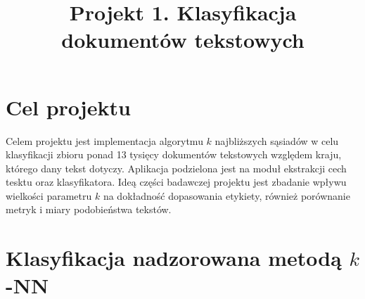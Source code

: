 \documentclass{classrep}
\author{
  \studentinfo{Daria Rogowska}{229989} \and
  \studentinfo{Mateusz Srebnik}{230004} }
\title{Projekt 1. Klasyfikacja dokumentów tekstowych}
\begin{document}
\maketitle


\section{Cel projektu}
Celem projektu jest implementacja algorytmu $k$ najbliższych sąsiadów w celu klasyfikacji
zbioru ponad 13 tysięcy dokumentów tekstowych \cite{teksty} względem kraju, którego dany tekst dotyczy. Aplikacja podzielona jest na moduł ekstrakcji 
cech tesktu oraz klasyfikatora. 
Ideą części badawczej projektu jest zbadanie wpływu wielkości parametru $k$
na dokładność dopasowania etykiety, również porównanie metryk i miary podobieństwa tekstów.





\section{Klasyfikacja nadzorowana metodą $k$-NN}
\end{document}
